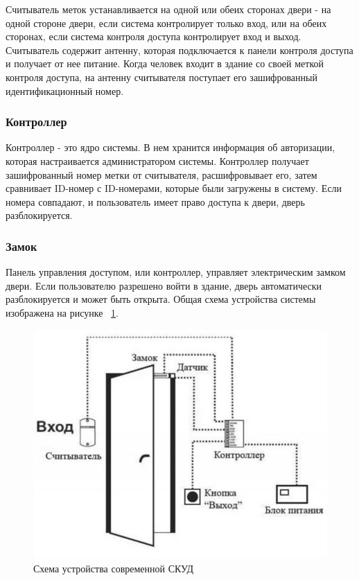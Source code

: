 Считыватель меток устанавливается на одной или обеих сторонах двери - на одной стороне двери, если система контролирует только вход, или на обеих сторонах, если система контроля доступа контролирует вход и выход. Считыватель содержит антенну, которая подключается к панели контроля доступа и получает от нее питание.
Когда человек входит в здание со своей меткой контроля доступа, на антенну считывателя поступает его зашифрованный идентификационный номер.

\subsubsection {Контроллер}

Контроллер - это ядро системы. В нем хранится информация об авторизации, которая настраивается администратором системы. Контроллер получает зашифрованный номер метки от считывателя, расшифровывает его, затем сравнивает ID-номер с ID-номерами, которые были загружены в систему. Если номера совпадают, и пользователь имеет право доступа к двери, дверь разблокируется.

\subsubsection {Замок}

Панель управления доступом, или контроллер, управляет электрическим замком двери. Если пользователю разрешено войти в здание, дверь автоматически разблокируется и может быть открыта.
Общая схема устройства системы изображена на рисунке ~\ref{fig:commonscheme1}.
\begin{figure}
	\centering
	\includegraphics[width=1\linewidth]{images/CommonScheme1}
	\caption{Схема устройства современной СКУД}
	\label{fig:commonscheme1}
\end{figure}

